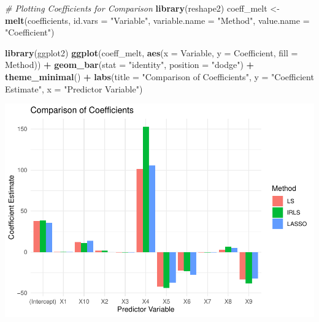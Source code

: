 \documentclass[
]{article}
\newenvironment{Shaded}{\begin{snugshade}}{\end{snugshade}}
\newcommand{\AttributeTok}[1]{\textcolor[rgb]{0.13,0.29,0.53}{#1}}
\newcommand{\CommentTok}[1]{\textcolor[rgb]{0.56,0.35,0.01}{\textit{#1}}}
\newcommand{\FunctionTok}[1]{\textcolor[rgb]{0.13,0.29,0.53}{\textbf{#1}}}
\newcommand{\NormalTok}[1]{#1}
\newcommand{\OtherTok}[1]{\textcolor[rgb]{0.56,0.35,0.01}{#1}}
\newcommand{\SpecialCharTok}[1]{\textcolor[rgb]{0.81,0.36,0.00}{\textbf{#1}}}
\newcommand{\StringTok}[1]{\textcolor[rgb]{0.31,0.60,0.02}{#1}}
\begin{document}
\begin{Shaded}
\begin{Highlighting}[]
\CommentTok{\# Plotting Coefficients for Comparison}
\FunctionTok{library}\NormalTok{(reshape2)}
\NormalTok{coeff\_melt }\OtherTok{\textless{}{-}} \FunctionTok{melt}\NormalTok{(coefficients, }\AttributeTok{id.vars =} \StringTok{"Variable"}\NormalTok{, }\AttributeTok{variable.name =} \StringTok{"Method"}\NormalTok{, }\AttributeTok{value.name =} \StringTok{"Coefficient"}\NormalTok{)}

\FunctionTok{library}\NormalTok{(ggplot2)}
\FunctionTok{ggplot}\NormalTok{(coeff\_melt, }\FunctionTok{aes}\NormalTok{(}\AttributeTok{x =}\NormalTok{ Variable, }\AttributeTok{y =}\NormalTok{ Coefficient, }\AttributeTok{fill =}\NormalTok{ Method)) }\SpecialCharTok{+}
  \FunctionTok{geom\_bar}\NormalTok{(}\AttributeTok{stat =} \StringTok{"identity"}\NormalTok{, }\AttributeTok{position =} \StringTok{"dodge"}\NormalTok{) }\SpecialCharTok{+}
  \FunctionTok{theme\_minimal}\NormalTok{() }\SpecialCharTok{+}
  \FunctionTok{labs}\NormalTok{(}\AttributeTok{title =} \StringTok{"Comparison of Coefficients"}\NormalTok{, }\AttributeTok{y =} \StringTok{"Coefficient Estimate"}\NormalTok{, }\AttributeTok{x =} \StringTok{"Predictor Variable"}\NormalTok{)}
\end{Highlighting}
\end{Shaded}

\includegraphics{Regression_files/figure-latex/unnamed-chunk-15-1.pdf}
\end{document}
